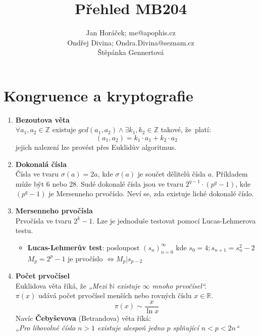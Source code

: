 \documentclass[12pt,a4paper]{article}
\begin{document}
	\title{\vspace{-1.5cm}Přehled MB204}
	\author{Jan Horáček; me@apophis.cz \\ Ondřej Divina; Ondra.Divina@seznam.cz\\Štěpánka Gennertová}
	\maketitle
	
	\section{Kongruence a kryptografie}
	
	\begin{enumerate}[leftmargin=*]
		\item \textbf{Bezoutova věta}\\
		$\forall a_1,a_2 \in  \mathbb{Z} $ existuje $gcd(a_1,a_2) \land \exists k_1,k_2 \in  \mathbb{Z} $ takové, že~platí:
		\[(a_1,a_2) = k_1 \cdot a_1 + k_2 \cdot a_2\]
		jejich nalezení lze provést přes Euklidův algoritmus.
		
		\item \textbf{Dokonalá čísla}\\
		Čísla ve tvaru $\sigma(a) = 2a$, kde $\sigma(a)$ je součet dělitelů čísla $a$. Příkladem může být 6 nebo 28. 
		Sudé dokonalé čísla jsou ve tvaru $2^{q-1}\cdot(p^q - 1)$, kde $(p^q - 1)$ je Mersenneho prvočíslo. Neví se, zda existuje liché dokonalé číslo.
		
		\item \textbf{Mersenneho prvočísla}\\
		Prvočísla ve tvaru $2^k - 1$. Lze je jednoduše testovat pomocí Lucas-Lehmerova testu.
		\begin{itemize}
			\item  \textbf{Lucas-Lehmerův test}: posloupost $(s_n)_{n=0}^{\infty}$ kde $s_0 = 4; s_{n+1} = s_n^2 - 2$\\
			$M_p = 2^p - 1 $ je prvočíslo $\Leftrightarrow M_p | s_{p-2}$
		\end{itemize}
		
		\item \textbf{Počet prvočísel}\\
		Euklidova věta říká, že\textit{ „Mezi $\mathbb{N}$ existuje $\infty$ mnoho prvočísel“.}\\
		$\pi(x)$ udává počet prvočísel menších nebo rovných číslu $x \in \mathbb{R}$. \\
		\[ \pi(x) \sim \frac{x}{\ln{x}} \]
		Navíc \textbf{Čebyševova} (Betrandova) věta říká: \\\textit{„Pro libovolné číslo $n>1$ existuje alespoň jedno $p$ splňující $n<p<2n$“}
		

\end{enumerate}
\end{document}
